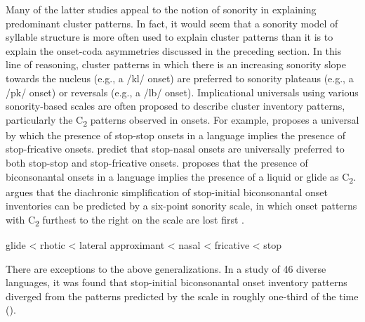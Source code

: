   Many of the latter studies appeal to the notion of sonority in explaining predominant cluster patterns. In fact, it would seem that a sonority model of syllable structure is more often used to explain cluster patterns than it is to explain the onset-coda asymmetries discussed in the preceding section. In this line of reasoning, cluster patterns in which there is an increasing sonority slope towards the nucleus (e.g., a /kl/ onset) are preferred to sonority plateaus (e.g., a /pk/ onset) or reversals (e.g., a /lb/ onset). Implicational universals using various sonority-based scales are often proposed to describe cluster inventory patterns, particularly the C\textsubscript{2} patterns observed in onsets. For example, \citet{Morelli1999} proposes a universal by which the presence of stop-stop onsets in a language implies the presence of stop-fricative onsets. \citet{LennertzBerent2015} predict that stop-nasal onsets are universally preferred to both stop-stop and stop-fricative onsets. \citet{Parker2012} proposes that the presence of biconsonantal onsets in a language implies the presence of a liquid or glide as C\textsubscript{2}. \citet{Vennemann2012} argues that the diachronic simplification of stop-initial biconsonantal onset inventories can be predicted by a six-point sonority scale, in which onset patterns with C\textsubscript{2} furthest to the right on the scale are lost first .

\ea\label{ex:1.7}
  glide < rhotic < lateral approximant < nasal < fricative < stop
\z

  There are exceptions to the above generalizations. In a study of 46 diverse languages, it was found that stop-initial biconsonantal onset inventory patterns diverged from the patterns predicted by the scale in  roughly one-third of the time (\citealt{EasterdayNapoleãodeSouza2015}). 

